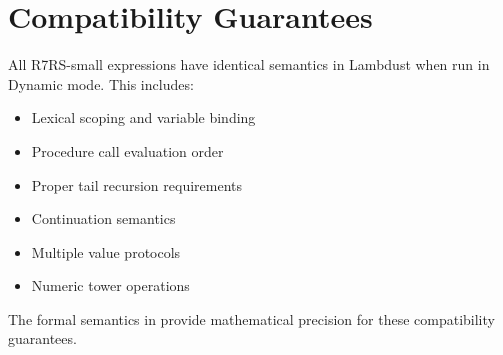 \section{Compatibility Guarantees}
\label{sec:compatibility}

\begin{compatibility}
All R7RS-small expressions have identical semantics in Lambdust when run in Dynamic mode. This includes:
\begin{itemize}
\item Lexical scoping and variable binding
\item Procedure call evaluation order  
\item Proper tail recursion requirements
\item Continuation semantics
\item Multiple value protocols
\item Numeric tower operations
\end{itemize}
\end{compatibility}

The formal semantics in  provide mathematical precision for these compatibility guarantees.